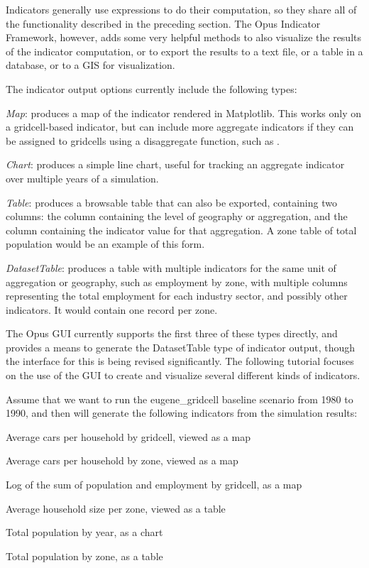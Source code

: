 Indicators generally use expressions to do their computation, so they share all of the functionality described in the preceding section.  The Opus Indicator Framework, however, adds some very helpful methods to also visualize the results of the indicator computation, or to export the results to a text file, or a table in a database, or to a GIS for visualization.

The indicator output options currently include the following types:

\squishlist
\item \emph{Map}: produces a map of the indicator rendered in Matplotlib. This works only on a gridcell-based indicator, but can include more aggregate indicators if they can be assigned to gridcells using a disaggregate function, such as .
\item \emph{Chart}: produces a simple line chart, useful for tracking an aggregate indicator over multiple years of a simulation.
\item \emph{Table}: produces a browsable table that can also be exported, containing two columns: the column containing the level of geography or aggregation, and the column containing the indicator value for that aggregation.  A zone table of total population would be an example of this form.
\item \emph{DatasetTable}: produces a table with multiple indicators for the same unit of aggregation or geography, such as employment by zone, with multiple columns representing the total employment for each industry sector, and possibly other indicators.  It would contain one record per zone.
\squishend

The Opus GUI currently supports the first three of these types directly, and provides a means to generate the DatasetTable type of indicator output, though the interface for this is being revised significantly.  The following tutorial focuses on the use of the GUI to create and visualize several different kinds of indicators.  

Assume that we want to run the eugene\_gridcell baseline scenario from 1980 to 1990, and then will generate the following indicators from the simulation results:

\squishlist
\item Average cars per household by gridcell, viewed as a map
\item Average cars per household by zone, viewed as a map
\item Log of the sum of population and employment by gridcell, as a map
\item Average household size per zone, viewed as a table
\item Total population by year, as a chart
\item Total population by zone, as a table
\squishend

